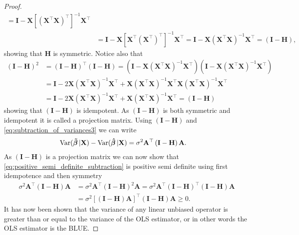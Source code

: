 \begin{proof}
\begin{align*}
        = \mathbf{I} - \mathbf{X}\left[(\mathbf{X}^\top\mathbf{X})^\top\right]^{-1}\mathbf{X}^\top \\
        &= \mathbf{I} - \mathbf{X}\left[\mathbf{X}^\top\left(\mathbf{X}^\top\right)^\top\right]^{-1}\mathbf{X}^\top 
        = \mathbf{I} - \mathbf{X}\left(\mathbf{X}^\top\mathbf{X}\right)^{-1}\mathbf{X}^\top = \left(\mathbf{I} - \mathbf{H}\right),
    \end{align*}
    showing that $\mathbf{H}$ is symmetric.
    Notice also that
    \begin{align*}
        \left(\mathbf{I} - \mathbf{H}\right)^2 &= \left(\mathbf{I} - \mathbf{H}\right)^\top\left(\mathbf{I} - \mathbf{H}\right) = (\mathbf{I} - \mathbf{X}\left(\mathbf{X}^\top\mathbf{X}\right)^{-1}\mathbf{X}^\top)(\mathbf{I} - \mathbf{X}\left(\mathbf{X}^\top\mathbf{X}\right)^{-1}\mathbf{X}^\top) \\
        &= \mathbf{I} - 2\mathbf{X}\left(\mathbf{X}^\top\mathbf{X}\right)^{-1}\mathbf{X}^\top + \mathbf{X}\left(\mathbf{X}^\top\mathbf{X}\right)^{-1}\mathbf{X}^\top\mathbf{X}\left(\mathbf{X}^\top\mathbf{X}\right)^{-1}\mathbf{X}^\top \\
        &= \mathbf{I} - 2\mathbf{X}\left(\mathbf{X}^\top\mathbf{X}\right)^{-1}\mathbf{X}^\top + \mathbf{X}\left(\mathbf{X}^\top\mathbf{X}\right)^{-1}\mathbf{X}^\top = \left(\mathbf{I} - \mathbf{H}\right)
    \end{align*}
    showing that $\left(\mathbf{I} - \mathbf{H}\right)$ is idempotent.
    As $\left(\mathbf{I} - \mathbf{H}\right)$ is both symmetric and idempotent it is called a projection matrix.
    Using $\left(\mathbf{I} - \mathbf{H}\right)$ and \eqref{eq:subtraction_of_variances3} we can write
    \begin{align}\label{eq:positive_semi_definite_subtraction}
        \operatorname{\text{Var}}(\operatorname{\boldsymbol{\Tilde{\beta}}}|\mathbf{X}) - \operatorname{\text{Var}}(\operatorname{\boldsymbol{\hat{\beta}}}|\mathbf{X}) &= \sigma^2\mathbf{A}^\top\left(\mathbf{I} - \mathbf{H}\right)\mathbf{A}.
    \end{align}
    As $\left(\mathbf{I} - \mathbf{H}\right)$ is a projection matrix we can now show that \eqref{eq:positive_semi_definite_subtraction} is positive semi definite using first idempotence and then symmetry
    \begin{align*}
        \sigma^2\mathbf{A}^\top\left(\mathbf{I} - \mathbf{H}\right)\mathbf{A} &= \sigma^2\mathbf{A}^\top\left(\mathbf{I} - \mathbf{H}\right)^2\mathbf{A} = \sigma^2\mathbf{A}^\top\left(\mathbf{I} - \mathbf{H}\right)^\top\left(\mathbf{I} - \mathbf{H}\right)\mathbf{A}\\
        &= \sigma^2\left[\left(\mathbf{I} - \mathbf{H}\right)\mathbf{A}\right]^\top\left(\mathbf{I} - \mathbf{H}\right)\mathbf{A} \geq 0.
    \end{align*}
    It has now been shown that the variance of any linear unbiased operator is greater than or equal to the variance of the OLS estimator, or in other words the OLS estimator is the BLUE.
\end{proof}

